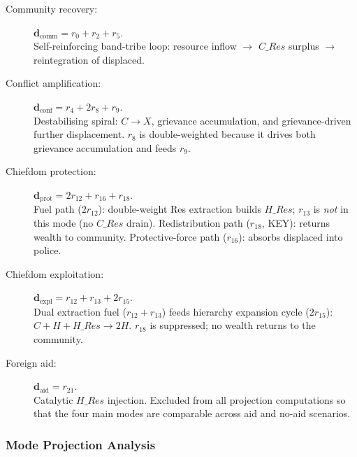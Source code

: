 \begin{description}
    \item[Community recovery:]
          $\mathbf{d}_{\text{comm}} = r_0 + r_2 + r_5$. \\
          Self-reinforcing band-tribe loop: resource inflow $\to$ $C\_\textit{Res}$
          surplus $\to$ reintegration of displaced.

    \item[Conflict amplification:]
          $\mathbf{d}_{\text{conf}} = r_4 + 2r_8 + r_9$. \\
          Destabilising spiral: $C\to X$, grievance accumulation, and
          grievance-driven further displacement.  $r_8$ is double-weighted
          because it drives both grievance accumulation and feeds $r_9$.

    \item[Chiefdom protection:]
          $\mathbf{d}_{\text{prot}} = 2r_{12} + r_{16} + r_{18}$. \\
          Fuel path ($2r_{12}$): double-weight Res extraction builds $H\_\textit{Res}$;
          $r_{13}$ is \emph{not} in this mode (no $C\_\textit{Res}$ drain).
          Redistribution path ($r_{18}$, KEY): returns wealth to community.
          Protective-force path ($r_{16}$): absorbs displaced into police.

    \item[Chiefdom exploitation:]
          $\mathbf{d}_{\text{expl}} = r_{12} + r_{13} + 2r_{15}$. \\
          Dual extraction fuel ($r_{12}+r_{13}$) feeds hierarchy expansion
          cycle ($2r_{15}$): $C+H+H\_\textit{Res}\to 2H$.
          $r_{18}$ is suppressed; no wealth returns to the community.

    \item[Foreign aid:]
          $\mathbf{d}_{\text{aid}} = r_{21}$. \\
          Catalytic $H\_\textit{Res}$ injection.  Excluded from all projection
          computations so that the four main modes are comparable across
          aid and no-aid scenarios.
\end{description}

\subsubsection*{Mode Projection Analysis}

